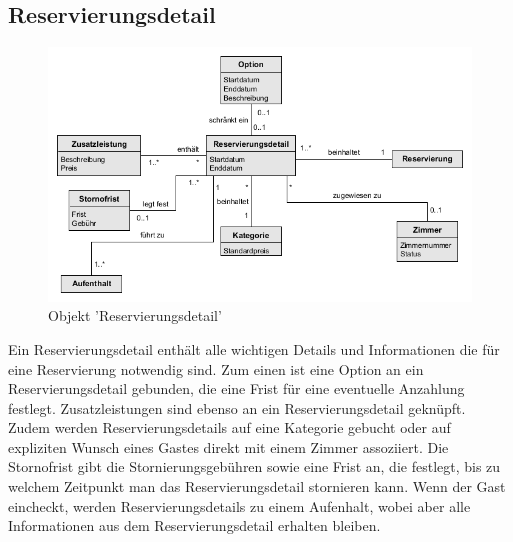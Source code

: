 \documentclass[../../Pflichtenheft.tex]{subfiles}
\begin{document}
    \subsection{Reservierungsdetail}
    \begin{figure}[ht!]
        \begin{center}
            \includegraphics[width=0.5\linewidth]{assets/reservierungDetail.png}
            \caption{Objekt 'Reservierungsdetail'} \label{reservierungDetail_model}
        \end{center}
    \end{figure}
    Ein Reservierungsdetail enthält alle wichtigen Details und Informationen die für eine
    Reservierung notwendig sind. Zum einen ist eine Option an ein Reservierungsdetail gebunden, die
    eine Frist für eine eventuelle Anzahlung festlegt. Zusatzleistungen sind ebenso an ein Reservierungsdetail
    geknüpft. Zudem werden Reservierungsdetails auf eine Kategorie gebucht oder auf expliziten Wunsch eines
    Gastes direkt mit einem Zimmer assoziiert. Die Stornofrist gibt die Stornierungsgebühren sowie eine Frist
    an, die festlegt, bis zu welchem Zeitpunkt man das Reservierungsdetail stornieren kann. Wenn der Gast
    eincheckt, werden Reservierungsdetails zu einem Aufenhalt, wobei aber alle Informationen aus dem Reservierungsdetail erhalten bleiben.
\end{document}
